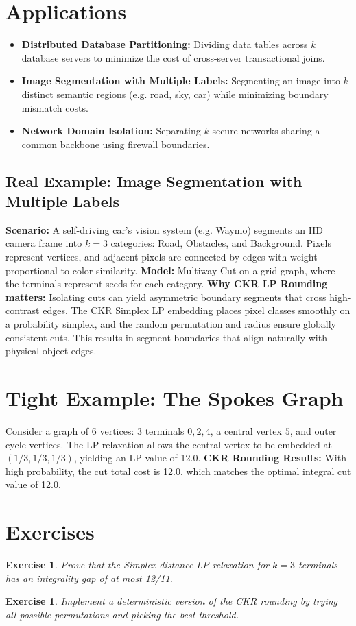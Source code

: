 \documentclass[11pt,oneside]{book}
\newtheorem{exercise}[theorem]{Exercise}
\begin{document}
\section{Applications}
\begin{itemize}
    \item \textbf{Distributed Database Partitioning:} Dividing data tables across $k$ database servers to minimize the cost of cross-server transactional joins.
    \item \textbf{Image Segmentation with Multiple Labels:} Segmenting an image into $k$ distinct semantic regions (e.g. road, sky, car) while minimizing boundary mismatch costs.
    \item \textbf{Network Domain Isolation:} Separating $k$ secure networks sharing a common backbone using firewall boundaries.
\end{itemize}

\subsection*{Real Example: Image Segmentation with Multiple Labels}
\textbf{Scenario:} A self-driving car's vision system (e.g. Waymo) segments an HD camera frame into $k=3$ categories: Road, Obstacles, and Background. Pixels represent vertices, and adjacent pixels are connected by edges with weight proportional to color similarity.
\textbf{Model:} Multiway Cut on a grid graph, where the terminals represent seeds for each category.
\textbf{Why CKR LP Rounding matters:} Isolating cuts can yield asymmetric boundary segments that cross high-contrast edges. The CKR Simplex LP embedding places pixel classes smoothly on a probability simplex, and the random permutation and radius ensure globally consistent cuts. This results in segment boundaries that align naturally with physical object edges.

\section{Tight Example: The Spokes Graph}
Consider a graph of 6 vertices: 3 terminals $0, 2, 4$, a central vertex $5$, and outer cycle vertices. 
The LP relaxation allows the central vertex to be embedded at $(1/3, 1/3, 1/3)$, yielding an LP value of 12.0.
\textbf{CKR Rounding Results:} With high probability, the cut total cost is 12.0, which matches the optimal integral cut value of 12.0.

\section{Exercises}
\begin{exercise}
Prove that the Simplex-distance LP relaxation for $k=3$ terminals has an integrality gap of at most 12/11.
\end{exercise}
\begin{exercise}
Implement a deterministic version of the CKR rounding by trying all possible permutations and picking the best threshold.
\end{exercise}
\end{document}
